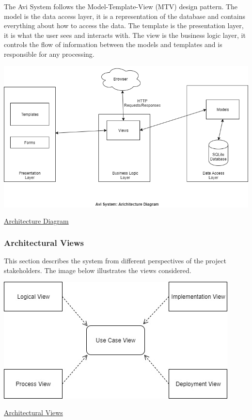 \documentclass[10pt]{article}
\begin{document}
The Avi System follows the Model-Template-View (MTV) design pattern. The model is the data access layer, it is a representation of the database and contains everything about how to access the data.  The template is the presentation layer, it is what the user sees and interacts with. The view is the business logic layer, it controls the flow of information between the models and templates and is responsible for any processing.

\begin{center}
\includegraphics[width=.9\textwidth]{architecture_diagram.png}
\end{center}
\caption{\underline{Architecture Diagram}}

\newpage

\subsubsection{Architectural Views}
This section describes the system from different perspectives of the project stakeholders. The image below illustrates the views considered.
\begin{center}
\includegraphics[width=.9\textwidth]{architecture_views.png}
\end{center}
\caption{\underline{Architectural Views}}
\end{document}
